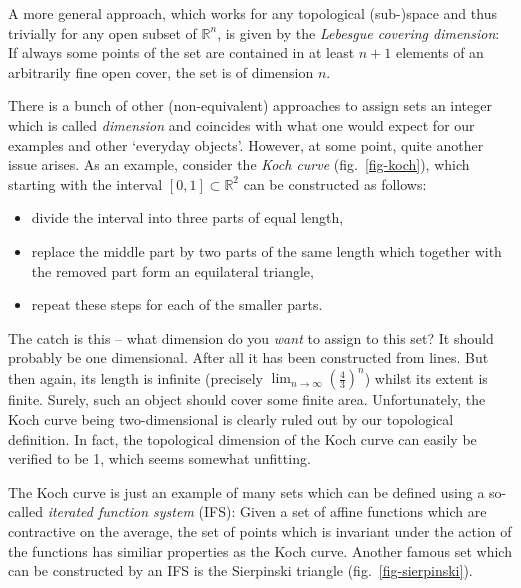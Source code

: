 \documentclass[twocolumn,10pt]{scrartcl}
\begin{document}
            A more general approach, which works for any topological (sub-)space and thus trivially for any open subset
            of $\mathbb{R}^n$, is given by the \emph{Lebesgue covering dimension}: If always some points of the set are
            contained in at least $n+1$ elements of an arbitrarily fine open cover, the set is of dimension $n$.

            There is a bunch of other (non-equivalent) approaches to assign sets an integer which is called
            \emph{dimension} and coincides with what one would expect for our examples and other `everyday objects'.
            However, at some point, quite another issue arises. As an example, consider the \emph{Koch curve}
            (fig.~\ref{fig-koch}), which starting with the interval $\left[0,1\right]\subset\mathbb{R}^2$ can be
            constructed as follows:
            \begin{itemize}
                \item divide the interval into three parts of equal length,
                \item replace the middle part by two parts of the same length which together with the removed part
                    form an equilateral triangle,
                \item repeat these steps for each of the smaller parts.
            \end{itemize}

            The catch is this -- what dimension do you \emph{want} to assign to this set? It should probably be
            one dimensional. After all it has been constructed from lines. But then again, its length is infinite
            (precisely $\lim_{n\rightarrow\infty}\left(\frac{4}{3}\right)^n$) whilst its extent is finite. Surely, such
            an object should cover some finite area. Unfortunately, the Koch curve being two-dimensional is clearly
            ruled out by our topological definition. In fact, the topological dimension of the Koch curve can easily be
            verified to be 1, which seems somewhat unfitting.

            The Koch curve is just an example of many sets which can be defined using a so-called
            \emph{iterated function system} (IFS): Given a set of affine
            functions which are contractive on the average, the set of points which is invariant under the action
            of the functions has similiar properties as the Koch curve. Another famous set which can be constructed by
            an IFS is the Sierpinski triangle (fig.~\ref{fig-sierpinski}).
\end{document}
